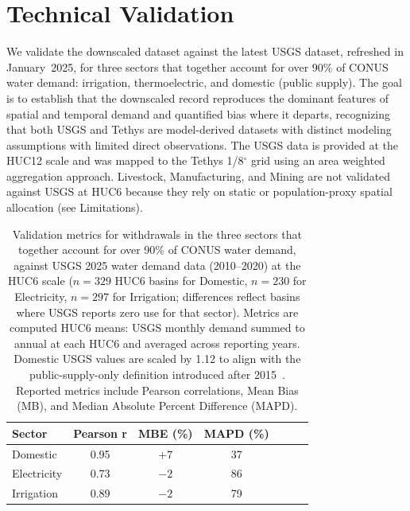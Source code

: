 \documentclass[fleqn,10pt]{wlscirep}
\begin{document}
\section*{Technical Validation}

We validate the downscaled dataset against the latest USGS dataset\cite{Stets2025USGS}, refreshed in January~2025, for three sectors that together account for over 90\% of CONUS water demand: irrigation, thermoelectric, and domestic (public supply)\cite{skinnerWaterWithdrawalConsumption2025}. The goal is to establish that the downscaled record reproduces the dominant features of spatial and temporal demand and quantified bias where it departs, recognizing that both USGS and Tethys are model-derived datasets with distinct modeling assumptions with limited direct observations. The USGS data is provided at the HUC12 scale and was mapped to the Tethys 1/8$^{\circ}$ grid using an area weighted aggregation approach. Livestock, Manufacturing, and Mining are not validated against USGS at HUC6 because they rely on static or population-proxy spatial allocation (see Limitations).


\begin{table}[ht]
\centering
\begin{tabular}{lcccccc}
\toprule
\textbf{Sector} & \textbf{Pearson r} & \textbf{MBE (\%)} & \textbf{MAPD (\%)} \\
\midrule
Domestic     & 0.95 & $+7$  & 37 \\
Electricity  & 0.73 & $-2$  & 86 \\
Irrigation   & 0.89 & $-2$  & 79 \\
\bottomrule
\end{tabular}
\caption{Validation metrics for withdrawals in the three sectors that together account for over 90\% of CONUS water demand, against USGS 2025 water demand data (2010--2020) at the HUC6 scale ($n=329$ HUC6 basins for Domestic, $n=230$ for Electricity, $n=297$ for Irrigation; differences reflect basins where USGS reports zero use for that sector). Metrics are computed HUC6 means: USGS monthly demand summed to annual at each HUC6 and averaged across reporting years. Domestic USGS values are scaled by 1.12 to align with the public-supply-only definition introduced after 2015~\cite{Stets2025USGS}. Reported metrics include Pearson correlations, Mean Bias (MB), and Median Absolute Percent Difference (MAPD).}
\label{tab:validation-metrics}
\end{table}
\end{document}
